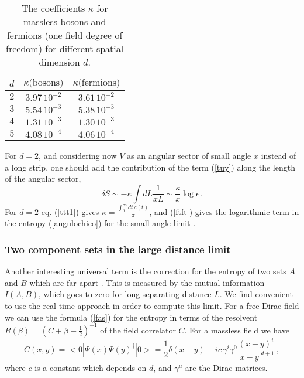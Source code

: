\documentclass[11pt]{article}
\begin{document}
 \begin{table}[t]
\centering
\begin{tabular}{|c|cc|} \hline 
$d$ & $\kappa \textrm{(bosons)}$ & $\kappa \textrm{(fermions)}$ \\  \hline
$2$ & $3.97 \,10^{-2}$& $3.61 \,10^{-2}$ \\  
$3$ & $5.54 \,10^{-3}$ & $5.38 \,10^{-3}$\\ 
$4$ & $1.31 \,10^{-3}$ & $1.30 \,10^{-3}$\\ 
$5$ & $4.08 \,10^{-4}$ & $4.06 \,10^{-4}$\\ \hline
\end{tabular} 
\label{tatal}
\caption{The coefficients $\kappa$ for massless bosons and fermions (one field degree of freedom) for different spatial dimension $d$.}
\end{table}
 
For $d=2$, and considering now $V$ as an angular sector of small angle $x$ instead of a long strip, one should add the contribution of the term (\ref{tuy}) along the length of the angular sector,
 \begin{equation}
\delta S\sim -\kappa \int dL \frac{1}{x L}\sim \frac{\kappa}{x}\log \epsilon\,.\label{ftft}
\end{equation}
 For $d=2$ eq. (\ref{ttt1}) gives $\kappa=\frac{\int_0^\infty dt \,c(t)}{\pi}$, and (\ref{ftft}) gives the logarithmic term in the entropy (\ref{angulochico}) for the small angle limit \cite{log}.  
 
\subsubsection{Two component sets in the large distance limit}
Another interesting universal term is the correction for the entropy of two sets $A$ and $B$ which are far apart \cite{remarks}. This is measured by the mutual information $I(A,B)$, which goes to zero for long separating distance $L$. 
 We find convenient to use the real time approach in order to compute this limit.  
For a free Dirac field we can use the formula (\ref{fas}) for the entropy  
in terms of the resolvent $R(\beta)=\left( C+\beta-\frac{1}{2}\right)^{-1}$ of the field correlator $C$. 
For a massless field we have 
\begin{equation}
C(x,y)=<0|\Psi(x)\Psi(y)^\dagger|0>= \frac{1}{2} \delta(x-y)+i c\, \gamma^i \gamma^0 \frac{(x-y)^i}{|x-y|^{d+1}}\,,
\end{equation}
where $c$ is a constant which depends on $d$, and $\gamma^\mu$ are the Dirac matrices.
\end{document}
